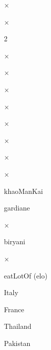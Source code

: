 \documentclass[a4paper,portrait,12pt]{article}
\begin{document}
×


×





2





×


×


×





×


×


×





×


×


\begin{flushleft}
khaoManKai
\end{flushleft}





\begin{flushleft}
gardiane
\end{flushleft}





×





\begin{flushleft}
biryani
\end{flushleft}





×





\begin{flushleft}
eatLotOf (elo)
\end{flushleft}


\begin{flushleft}
Italy
\end{flushleft}


\begin{flushleft}
France
\end{flushleft}


\begin{flushleft}
Thailand
\end{flushleft}


\begin{flushleft}
Pakistan
\end{flushleft}
\end{document}
